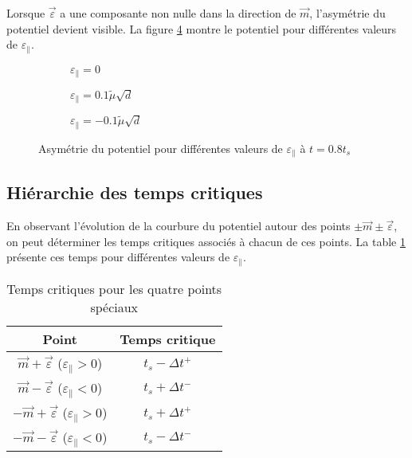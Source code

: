 \documentclass[11pt,a4paper]{article}
\begin{document}
Lorsque $\vec{\varepsilon}$ a une composante non nulle dans la direction de $\vec{m}$, l'asymétrie du potentiel devient visible. La figure \ref{fig:potential_asymmetry} montre le potentiel pour différentes valeurs de $\varepsilon_{\parallel}$.

\begin{figure}[h]
    \centering
    \begin{subfigure}{0.45\textwidth}
        \centering
        \caption{$\varepsilon_{\parallel} = 0$}
        \label{fig:eps_0}
    \end{subfigure}
    \begin{subfigure}{0.45\textwidth}
        \centering
        \caption{$\varepsilon_{\parallel} = 0.1\tilde{\mu}\sqrt{d}$}
        \label{fig:eps_pos}
    \end{subfigure}
    
    \begin{subfigure}{0.45\textwidth}
        \centering
        \caption{$\varepsilon_{\parallel} = -0.1\tilde{\mu}\sqrt{d}$}
        \label{fig:eps_neg}
    \end{subfigure}
    \caption{Asymétrie du potentiel pour différentes valeurs de $\varepsilon_{\parallel}$ à $t = 0.8 t_s$}
    \label{fig:potential_asymmetry}
\end{figure}

\subsection{Hiérarchie des temps critiques}

En observant l'évolution de la courbure du potentiel autour des points $\pm \vec{m} \pm \vec{\varepsilon}$, on peut déterminer les temps critiques associés à chacun de ces points. La table \ref{tab:critical_times} présente ces temps pour différentes valeurs de $\varepsilon_{\parallel}$.

\begin{table}[h]
    \centering
    \begin{tabular}{|c|c|}
        \hline
        Point & Temps critique \\
        \hline
        $\vec{m} + \vec{\varepsilon}$ ($\varepsilon_{\parallel} > 0$) & $t_s - \Delta t^+$ \\
        $\vec{m} - \vec{\varepsilon}$ ($\varepsilon_{\parallel} < 0$) & $t_s + \Delta t^-$ \\
        $-\vec{m} + \vec{\varepsilon}$ ($\varepsilon_{\parallel} > 0$) & $t_s + \Delta t^+$ \\
        $-\vec{m} - \vec{\varepsilon}$ ($\varepsilon_{\parallel} < 0$) & $t_s - \Delta t^-$ \\
        \hline
    \end{tabular}
    \caption{Temps critiques pour les quatre points spéciaux}
    \label{tab:critical_times}
\end{table}
\end{document}
